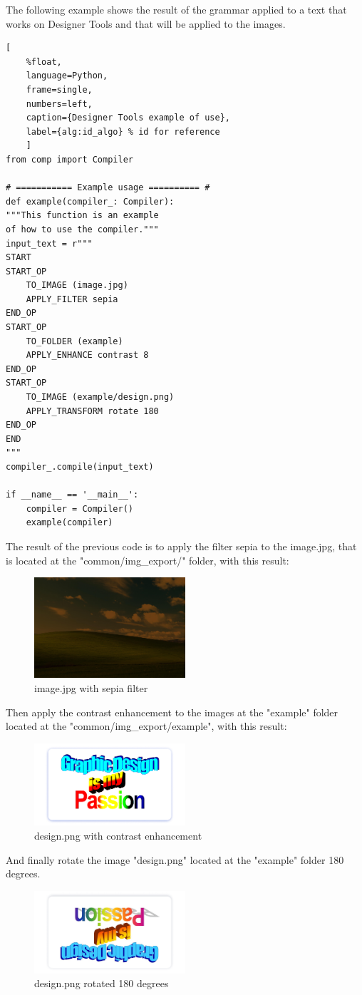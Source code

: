 The following example shows the result of the grammar applied to a text that works on Designer Tools and that will be applied to the images.
\begin{lstlisting}[  
    %float,
    language=Python, 
    frame=single, 
    numbers=left,
    caption={Designer Tools example of use},
    label={alg:id_algo} % id for reference
    ]        
from comp import Compiler

# =========== Example usage ========== #
def example(compiler_: Compiler):
"""This function is an example 
of how to use the compiler."""
input_text = r"""
START
START_OP
    TO_IMAGE (image.jpg)
    APPLY_FILTER sepia
END_OP
START_OP
    TO_FOLDER (example)
    APPLY_ENHANCE contrast 8
END_OP
START_OP
    TO_IMAGE (example/design.png)
    APPLY_TRANSFORM rotate 180
END_OP
END
"""
compiler_.compile(input_text)

if __name__ == '__main__':
    compiler = Compiler()
    example(compiler)
\end{lstlisting}
The result of the previous code is to apply the filter sepia to the image.jpg, that is located at the "common/img\_export/" folder, with this result:
\begin{figure}[H]
    \centering
    \includegraphics[width=0.5\textwidth]{img/image2.jpg}
    \caption{image.jpg with sepia filter}
    \label{fig:id_figura}
\end{figure}
Then apply the contrast enhancement to the images at the "example" folder located at the "common/img\_export/example", with this result:
\begin{figure}[H]
    \centering
    \includegraphics[width=0.5\textwidth]{img/design2.png}
    \caption{design.png with contrast enhancement}
    \label{fig:id_figura}
\end{figure}
And finally rotate the image "design.png" located at the "example" folder 180 degrees.
\begin{figure}[H]
    \centering
    \includegraphics[width=0.5\textwidth]{img/design3.png}
    \caption{design.png rotated 180 degrees}
    \label{fig:id_figura}
\end{figure}